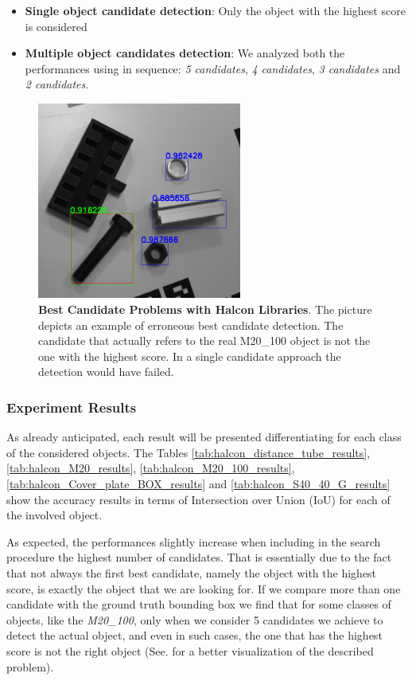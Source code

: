 \begin{itemize}
	\item \textbf{Single object candidate detection}: Only the object with the highest score is considered
	\item \textbf{Multiple object candidates detection}: We analyzed both the performances using in sequence: \emph{5 candidates}, \emph{4 candidates}, \emph{3 candidates} and \emph{2 candidates}.
\end{itemize}

\begin{figure}
    \centering
    \includegraphics[width=0.6\textwidth]{figures/4_experiments/m20_100_halcon_detection_problems}
    \caption{\textbf{Best Candidate Problems with Halcon Libraries}. The picture depicts an example of erroneous best candidate detection. The candidate that actually refers to the real M20\_100 object is not the one with the highest score. In a single candidate approach the detection would have failed.}
    \label{fig:m20_100_halcon_detection_problems}
\end{figure}

\subsubsection{Experiment Results}
As already anticipated, each result will be presented differentiating for each class of the considered objects. The Tables \ref{tab:halcon_distance_tube_results}, \ref{tab:halcon_M20_results}, \ref{tab:halcon_M20_100_results}, \ref{tab:halcon_Cover_plate_BOX_results} and \ref{tab:halcon_S40_40_G_results} show the accuracy results in terms of Intersection over Union (IoU) for each of the involved object.

As expected, the performances slightly increase when including in the search procedure the highest number of candidates. That is essentially due to the fact that not always the first best candidate, namely the object with the highest score, is exactly the object that we are looking for. If we compare more than one candidate with the ground truth bounding box we find that for some classes of objects, like the \emph{M20\_100}, only when we consider 5 candidates we achieve to detect the actual object, and even in such cases, the one that has the highest score is not the right object (See.  for a better visualization of the described problem).

